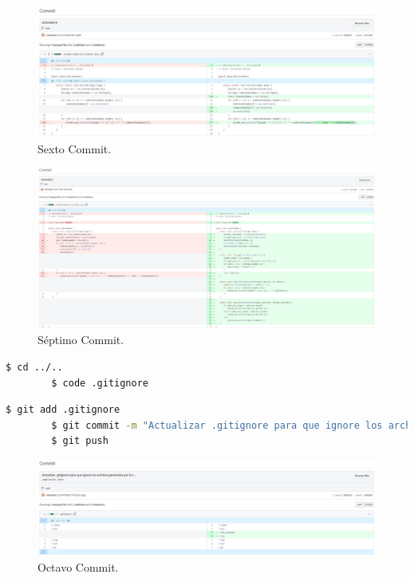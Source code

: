 \documentclass{article}
\begin{document}
\begin{figure}[H]
	\centering
	\includegraphics[width=1\textwidth,keepaspectratio]{img/commit06.jpg}
	\caption{Sexto Commit.}
\end{figure}
\begin{figure}[H]
	\centering
	\includegraphics[width=1\textwidth,keepaspectratio]{img/commit07.jpg}
	\caption{Séptimo Commit.}
\end{figure}
\begin{lstlisting}[language=bash,caption={Actualizando .gitignore}]
		$ cd ../..
		$ code .gitignore
	\end{lstlisting}
\begin{lstlisting}[language=bash,caption={Octavo Commit / .gitignore}]
		$ git add .gitignore
		$ git commit -m "Actualizar .gitignore para que ignore los archivos generados por la compilacion latex"
		$ git push
	\end{lstlisting}
\begin{figure}[H]
	\centering
	\includegraphics[width=1\textwidth,keepaspectratio]{img/commit08.jpg}
	\caption{Octavo Commit.}
\end{figure}
\end{document}

